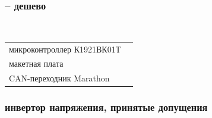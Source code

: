 \begin{frame}
\frametitle{ -- дешево}
\begin{figure}
\begin{center}
\begin{minipage}[h]{0.5\linewidth}
  \\
\end{minipage}
\end{center}
\end{figure}
\begin{tabular}{ll}
микроконтроллер К1921ВК01Т        &\\
макетная плата &\\
CAN-переходник Marathon &\\
\end{tabular}
\end{frame}



\begin{frame}
\frametitle{\small инвертор напряжения, принятые допущения}
	\hspace{-1cm}
\begin{figure}[!ht]

\end{figure}
\end{frame}

